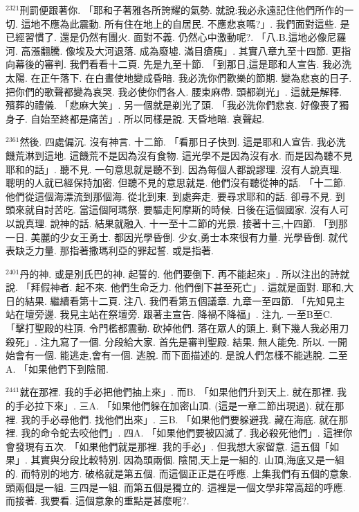 \documentclass{book}
\begin{document}
$^{2321}$刑罰便跟著你.
「耶和子著雅各所誇耀的氣勢.
就說:我必永遠記住他們所作的一切.
這地不應為此震動.
所有住在地上的自居民.
不應悲哀嗎?」.
我們面對這些.
是已經習慣了.
還是仍然有團火.
面對不義.
仍然心中激動呢?.
「八.B.這地必像尼羅河.
高漲翻騰.
像埃及大河退落.
成為廢墟.
滿目瘡痍」.
其實八章九至十四節.
更指向幕後的審判.
我們看看十二頁.
先是九至十節.
「到那日,這是耶和人宣告.
我必洗太陽.
在正午落下.
在白晝使地變成昏暗.
我必洗你們歡樂的節期.
變為悲哀的日子.
把你們的歌聲都變為哀哭.
我必使你們各人.
腰束麻帶.
頭都剃光」.
這就是解釋.
殯葬的禮儀.
「悲麻大笑」.
另一個就是剃光了頭.
「我必洗你們悲哀.
好像喪了獨身子.
自始至終都是痛苦」.
所以同樣是說.
天昏地暗.
哀聲起.

$^{2361}$然後.
四處偏沉.
沒有神言.
十二節.
「看那日子快到.
這是耶和人宣告.
我必洗饑荒淋到這地.
這饑荒不是因為沒有食物.
這光學不是因為沒有水.
而是因為聽不見耶和的話」.
聽不見.
一句意思就是聽不到.
因為每個人都說謬理.
沒有人說真理.
聰明的人就已經保持加密.
但聽不見的意思就是.
他們沒有聽從神的話.
「十二節.
他們從這個海漂流到那個海.
從北到東.
到處奔走.
要尋求耶和的話.
卻尋不見.
到頭來就自討苦吃.
當這個阿瑪祭.
要驅走阿摩斯的時候.
日後在這個國家.
沒有人可以說真理.
說神的話.
結果就融入.
十一至十二節的光景.
接著十三,十四節.
「到那一日.
美麗的少女王勇士.
都因光學昏倒.
少女,勇士本來很有力量.
光學昏倒.
就代表缺乏力量.
那指著撒瑪利亞的罪起誓.
或是指著.

$^{2401}$丹的神.
或是別氏巴的神.
起誓的.
他們要倒下.
再不能起來」.
所以注出的詩就說.
「拜假神者.
起不來.
他們生命乏力.
他們倒下甚至死亡」.
這就是面對.
耶和,大日的結果.
繼續看第十二頁.
注八.
我們看第五個議章.
九章一至四節.
「先知見主站在壇旁邊.
我見主站在祭壇旁.
跟著主宣告.
降禍不降福」.
注九.
一至B至C.
「擊打聖殿的柱頂.
令門檻都震動.
砍掉他們.
落在眾人的頭上.
剩下幾人我必用刀殺死」.
注九寫了一個.
分段給大家.
首先是審判聖殿.
結果.
無人能免.
所以.
一開始會有一個.
能逃走,會有一個.
逃脫.
而下面描述的.
是說人們怎樣不能逃脫.
二至A.
「如果他們下到陰間.

$^{2441}$就在那裡.
我的手必把他們抽上來」.
而B.
「如果他們升到天上.
就在那裡.
我的手必拉下來」.
三A.
「如果他們躲在加密山頂.
(這是一章二節出現過).
就在那裡.
我的手必尋他們.
找他們出來」.
三B.
「如果他們要躲避我.
藏在海底.
就在那裡.
我的命令蛇去咬他們」.
四A.
「如果他們要被囚滅了.
我必殺死他們」.
這裡你會發現有五次.
「如果他們就是那裡.
我的手必」.
但我想大家留意.
這五個「如果」.
其實與分段比較特別.
因為頭兩個.
陰間,天上是一組的.
山頂,海底又是一組的.
而特別的地方.
破格就是第五個.
而這個正正是在呼應.
上集我們有五個的意象.
頭兩個是一組.
三四是一組.
而第五個是獨立的.
這裡是一個文學非常高超的呼應.
而接著.
我要看.
這個意象的重點是甚麼呢?.
\end{document}

